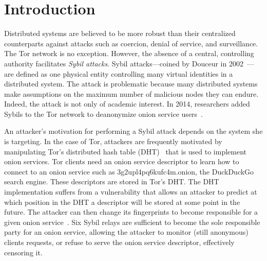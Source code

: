 \section{Introduction}
\label{sec:introduction}

Distributed systems are believed to be more robust than their centralized
counterparts against attacks such as coercion, denial of service, and
surveillance.  The Tor network is no exception.  However, the absence of a
central, controlling authority facilitates \emph{Sybil attacks}.  Sybil
attacks---coined by Douceur in 2002~\cite{Douceur2002a}---are defined as one
physical entity controlling many virtual identities in a distributed system.
The attack is problematic because many distributed systems make assumptions on
the maximum number of malicious nodes they can endure.  Indeed, the attack is
not only of academic interest.  In 2014, researchers added Sybils to the Tor
network to deanonymize onion service users~\cite{cmucert}.

An attacker's motivation for performing a Sybil attack depends on the system she
is targeting.  In the case of Tor, attackers are frequently motivated by
manipulating Tor's distributed hash table (DHT)~\cite{rendspec} that is used to
implement onion services.  Tor clients need an onion service descriptor to learn
how to connect to an onion service such as 3g2upl4pq6kufc4m.onion, the
DuckDuckGo search engine.  These descriptors are stored in Tor's DHT.  The DHT
implementation suffers from a vulnerability that allows an attacker to predict
at which position in the DHT a descriptor will be stored at some point in the
future.  The attacker can then change its fingerprints to become responsible for
a given onion service~\cite{Biryukov2013a}.  Six Sybil relays are sufficient to
become the sole responsible party for an onion service, allowing the attacker to
monitor (still anonymous) clients requests, or refuse to serve the onion service
descriptor, effectively censoring it.

